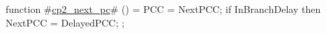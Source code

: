 function #\hyperref[zcp2zynextzypc]{cp2\_next\_pc}# () = {
  PCC = NextPCC;
  if InBranchDelay then {
    NextPCC = DelayedPCC;
  };
}
